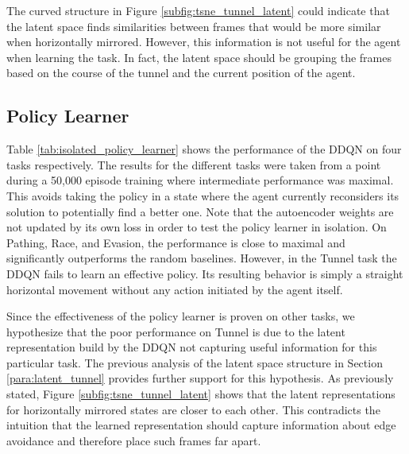 The curved structure in Figure \ref{subfig:tsne_tunnel_latent} could indicate that the latent space finds similarities between frames that would be more similar when horizontally mirrored.
However, this information is not useful for the agent when learning the task. In fact, the latent space should be grouping the frames based on the course of the tunnel and the current position of the agent. 

\subsection{Policy Learner}
Table \ref{tab:isolated_policy_learner} shows the performance of the DDQN on four tasks respectively. The results for the different tasks were taken from a point during a 50,000 episode training where intermediate performance was maximal. This avoids taking the policy in a state where the agent currently reconsiders its solution to potentially find a better one. Note that the autoencoder weights are not updated by its own loss in order to test the policy learner in isolation. On Pathing, Race, and Evasion, the performance is close to maximal and significantly outperforms the random baselines. However, in the Tunnel task the DDQN fails to learn an effective policy. Its resulting behavior is simply a straight horizontal movement without any action initiated by the agent itself.

Since the effectiveness of the policy learner is proven on other tasks, we hypothesize that the poor performance on Tunnel is due to the latent representation build by the DDQN not capturing useful information for this particular task. The previous analysis of the latent space structure in Section \ref{para:latent_tunnel} provides further support for this hypothesis. As previously stated, Figure \ref{subfig:tsne_tunnel_latent} shows that the latent representations for horizontally mirrored states are closer to each other. This contradicts the intuition that the learned representation should capture information about edge avoidance and therefore place such frames far apart.

